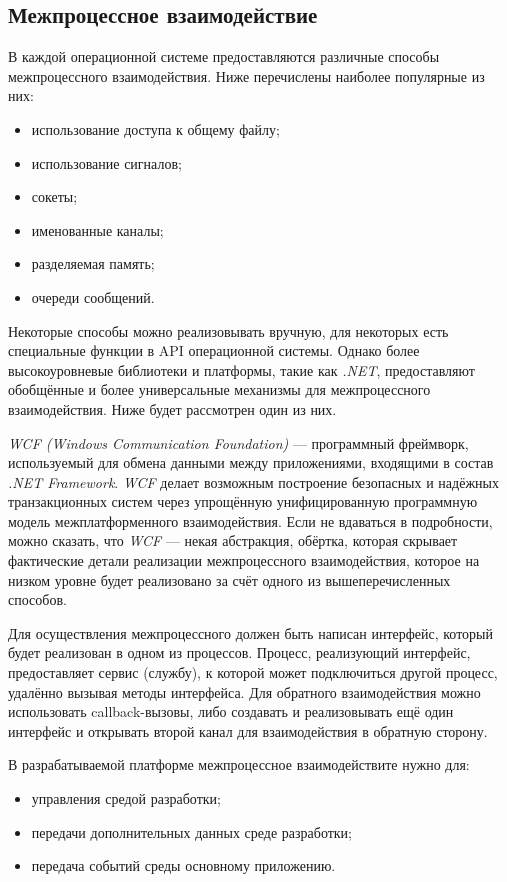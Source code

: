 \subsection{Межпроцессное взаимодействие}
\label{sec:ipc}

В каждой операционной системе предоставляются различные способы межпроцессного взаимодействия. Ниже перечислены наиболее популярные из них:
\begin{itemize}
   \item использование доступа к общему файлу;
   \item использование сигналов;
   \item сокеты;
   \item именованные каналы;
   \item разделяемая память;
   \item очереди сообщений.
\end{itemize}

Некоторые способы можно реализовывать вручную, для некоторых есть специальные функции в API операционной системы. Однако более высокоуровневые библиотеки и платформы, такие как {\it .NET}, предоставляют обобщённые и более универсальные механизмы для межпроцессного взаимодействия. Ниже будет рассмотрен один из них.

{\it WCF (Windows Communication Foundation)} --- программный фреймворк, используемый для обмена данными между приложениями, входящими в состав {\it .NET Framework}. {\it WCF} делает возможным построение безопасных и надёжных транзакционных систем через упрощённую унифицированную программную модель межплатформенного взаимодействия. Если не вдаваться в подробности, можно сказать, что {\it WCF} --- некая абстракция, обёртка, которая скрывает фактические детали реализации межпроцессного взаимодействия, которое на низком уровне будет реализовано за счёт одного из вышеперечисленных способов. 

Для осуществления межпроцессного должен быть написан интерфейс, который будет реализован в одном из процессов. Процесс, реализующий интерфейс, предоставляет сервис (службу), к которой может подключиться другой процесс, удалённо вызывая методы интерфейса. Для обратного взаимодействия можно использовать callback-вызовы, либо создавать и реализовывать ещё один интерфейс и открывать второй канал для взаимодействия в обратную сторону. 

В разрабатываемой платформе межпроцессное взаимодействите нужно для:
\begin{itemize}
 \item управления средой разработки;
 \item передачи дополнительных данных среде разработки;
 \item передача событий среды основному приложению.
\end{itemize}


\pagebreak
